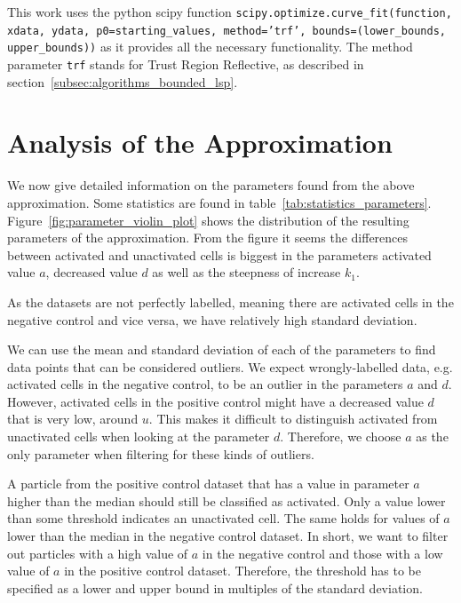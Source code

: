 This work uses the python scipy function \texttt{scipy.optimize.curve\_fit(function, xdata, ydata, p0=starting\_values, method='trf', bounds=(lower\_bounds, upper\_bounds))} as it provides all the necessary functionality. The method parameter \texttt{trf} stands for Trust Region Reflective, as described in section~\ref{subsec:algorithms_bounded_lsp}.

\newpage
\section{Analysis of the Approximation}
\label{sec:analysis_of_approximation}

We now give detailed information on the parameters found from the above approximation. Some statistics are found in table~\ref{tab:statistics_parameters}. Figure~\ref{fig:parameter_violin_plot} shows the distribution of the resulting parameters of the approximation. From the figure it seems the differences between activated and unactivated cells is biggest in the parameters activated value $a$, decreased value $d$ as well as the steepness of increase $k_1$.

As the datasets are not perfectly labelled, meaning there are activated cells in the negative control and vice versa, we have relatively high standard deviation.

We can use the mean and standard deviation of each of the parameters to find data points that can be considered outliers. We expect wrongly-labelled data, e.g. activated cells in the negative control, to be an outlier in the parameters $a$ and $d$. However, activated cells in the positive control might have a decreased value $d$ that is very low, around $u$. This makes it difficult to distinguish activated from unactivated cells when looking at the parameter $d$. Therefore, we choose $a$ as the only parameter when filtering for these kinds of outliers.

A particle from the positive control dataset that has a value in parameter $a$ higher than the median should still be classified as activated. Only a value lower than some threshold indicates an unactivated cell. The same holds for values of $a$ lower than the median in the negative control dataset. In short, we want to filter out particles with a high value of $a$ in the negative control and those with a low value of $a$ in the positive control dataset. Therefore, the threshold has to be specified as a lower and upper bound in multiples of the standard deviation.

